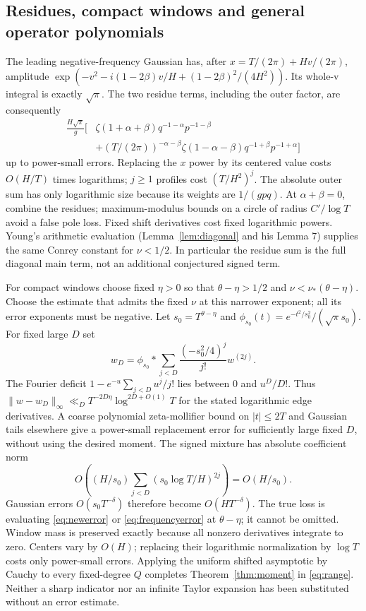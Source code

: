 \documentclass[11pt]{article}
\theoremstyle{remark}
\begin{document}
\subsection{Residues, compact windows and general operator polynomials}
The leading negative-frequency Gaussian has, after
$x=T/(2\pi)+Hv/(2\pi)$, amplitude
$\exp(-v^2-i(1-2\beta)v/H+(1-2\beta)^2/(4H^2))$.
Its whole-v integral is exactly $\sqrt\pi$.
The two residue terms, including the outer factor, are consequently
\[
 \begin{aligned}
 \frac{H\sqrt\pi}g\big[&
 \zeta(1+\alpha+\beta)q^{-1-\alpha}p^{-1-\beta}\\
 &+(T/(2\pi))^{-\alpha-\beta}\zeta(1-\alpha-\beta)
                       q^{-1+\beta}p^{-1+\alpha}\big]
 \end{aligned}
\]
up to power-small errors. Replacing the $x$ power by its centered value
costs $O(H/T)$ times logarithms; $j\ge1$ profiles cost $(T/H^2)^j$.
The absolute outer sum has only logarithmic size because its weights
are $1/(gpq)$. At $\alpha+\beta=0$, combine the residues; maximum-modulus
bounds on a circle of radius $C'/\log T$ avoid a false pole loss.
Fixed shift derivatives cost fixed logarithmic powers. Young's arithmetic
evaluation (Lemma~\ref{lem:diagonal} and his Lemma 7) supplies the same
Conrey constant for $\nu<1/2$. In particular the residue sum is the full
diagonal main term, not an additional conjectured signed term.

For compact windows choose fixed $\eta>0$ so that
$\theta-\eta>1/2$ and $\nu<\nu_*(\theta-\eta)$.
Choose the estimate that admits the fixed $\nu$ at this narrower exponent;
all its error exponents must be negative.
Let $s_0=T^{\theta-\eta}$ and
$\phi_{s_0}(t)=e^{-t^2/s_0^2}/(\sqrt\pi s_0)$. For fixed large $D$ set
\[
 w_D=\phi_{s_0}*\sum_{j<D}\frac{(-s_0^2/4)^j}{j!}w^{(2j)}.
\]
The Fourier deficit $1-e^{-u}\sum_{j<D}u^j/j!$ lies between $0$ and
$u^D/D!$. Thus $\|w-w_D\|_\infty\ll_D
T^{-2D\eta}\log^{2D+O(1)}T$ for the stated logarithmic edge derivatives.
A coarse polynomial zeta-mollifier bound on $|t|\le2T$ and Gaussian
tails elsewhere give a power-small replacement error for sufficiently
large fixed $D$, without using the desired moment. The signed mixture
has absolute coefficient norm
\[
 O\left((H/s_0)\sum_{j<D}(s_0\log T/H)^{2j}\right)=O(H/s_0).
\]
Gaussian errors $O(s_0T^{-\delta})$ therefore become $O(HT^{-\delta})$.
The true loss is evaluating \eqref{eq:newerror} or \eqref{eq:frequencyerror} at $\theta-\eta$;
it cannot be omitted. Window mass is preserved exactly because all
nonzero derivatives integrate to zero. Centers vary by $O(H)$;
replacing their logarithmic normalization by $\log T$ costs only
power-small errors. Applying the uniform shifted asymptotic by Cauchy
to every fixed-degree $Q$ completes Theorem~\ref{thm:moment} in
\eqref{eq:range}. Neither a sharp indicator nor an infinite Taylor
expansion has been substituted without an error estimate.
\end{document}
